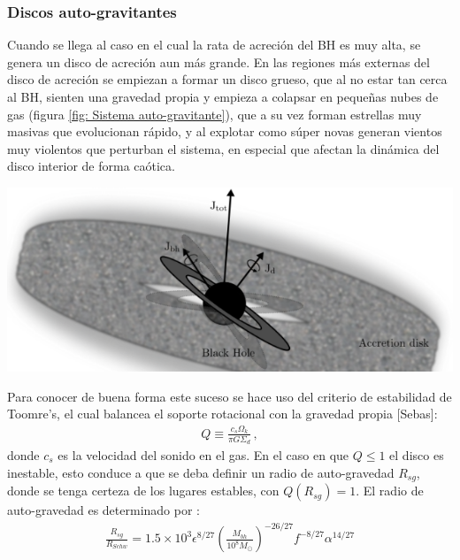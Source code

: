     \subsubsection{Discos auto-gravitantes}
    \label{subsubsec: Disco auto-gravitantes}
Cuando se llega al caso en el cual la rata de acreción del BH es muy alta, se genera un disco de acreción aun más grande. En las regiones más externas del disco de acreción se empiezan a formar un disco grueso, que al no estar tan cerca al BH, sienten una gravedad propia y empieza a colapsar en pequeñas nubes de gas (figura \ref{fig: Sistema auto-gravitante}), que a su vez forman estrellas muy masivas que evolucionan rápido, y al explotar como súper novas generan vientos muy violentos que perturban el sistema, en especial que afectan la dinámica del disco interior de forma caótica. 
%
\begin{center}
\includegraphics[scale=.3]{./figures/4_Modelo_Spin/Sistema_auto-gravitante.png}
\label{fig: Sistema auto-gravitante}
\end{center}
%
Para conocer de buena forma este suceso se hace uso del criterio de estabilidad de Toomre's, el cual balancea  el soporte rotacional con la gravedad propia [Sebas]:
%
\begin{align}
    Q\equiv\frac{c_{s}\Omega_{k}}{\pi G\Sigma_{d}}\,,
    \label{eq: estabilidad_Toomre's}
\end{align}
%
donde $c_{s}$ es la velocidad del sonido en el gas. En el caso en que $Q\leq 1$ el disco es inestable, esto conduce a que se deba definir un radio de auto-gravedad $R_{sg}$, donde se tenga certeza de los lugares estables, con $Q(R_{sg})=1$. El radio de auto-gravedad es determinado por \cite{fanidakis2011}:
%
\begin{align}
    \frac{R_{sg}}{R_{Schw}}=1.5\times 10^{3}\epsilon^{8/27}\left(\frac{M_{bh}}{10^{8}M_{\odot}} \right)^{-26/27}f^{-8/27}\alpha^{14/27}
\end{align}
